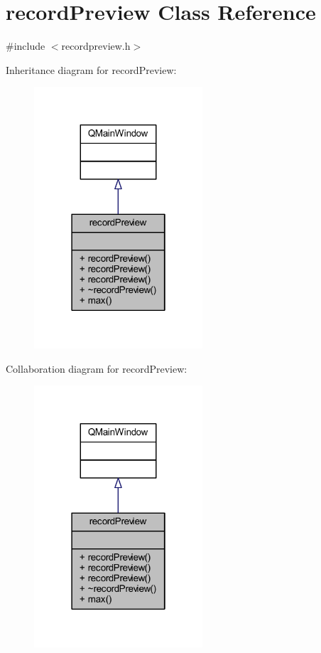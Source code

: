 \hypertarget{a00020}{\section{record\+Preview Class Reference}
\label{a00020}
}


{\ttfamily \#include $<$recordpreview.\+h$>$}



Inheritance diagram for record\+Preview\+:
\nopagebreak
\begin{figure}[H]
\begin{center}
\leavevmode
\includegraphics[width=178pt]{da/d50/a00301}
\end{center}
\end{figure}


Collaboration diagram for record\+Preview\+:
\nopagebreak
\begin{figure}[H]
\begin{center}
\leavevmode
\includegraphics[width=178pt]{d0/d61/a00302}
\end{center}
\end{figure}
